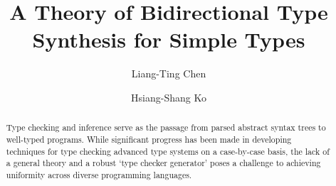\documentclass[acmsmall,screen]{acmart}
\theoremstyle{acmdefinition}
\begin{document}
\author{Liang-Ting Chen}
\author{Hsiang-Shang Ko}


\title{A Theory of Bidirectional Type Synthesis for Simple Types}

\begin{abstract}
%
  Type checking and inference serve as the passage from parsed abstract syntax trees to well-typed programs.
  While significant progress has been made in developing techniques for type checking advanced type systems on a case-by-case basis, the lack of a general theory and a robust `type checker generator' poses a challenge to achieving uniformity across diverse programming languages.


\end{abstract}
\end{document}
